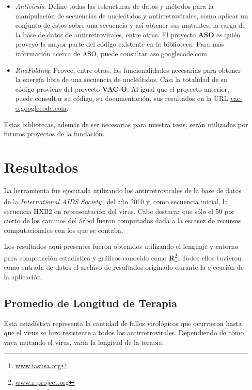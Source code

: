 \begin{itemize}
  \item \textit{Antivirals}: Define todas las estructuras de datos y m\'etodos para la manipulaci\'on de secuencias de nucle\'otidos y antirretrovirales, como
    aplicar un conjunto de \'estos sobre una secuencia y asi obtener sus mutantes, la carga de la base de datos de antirretrovirales, entre otras. El
    proyecto \textbf{ASO} es qui\'en provey\'o la mayor parte del c\'odigo existente en la biblioteca. Para m\'as informaci\'on acerca de ASO, puede
    consultar \url{aso.googlecode.com}.
  \item \textit{RnaFolding}: Provee, entre otras, las funcionalidades necesarias para obtener la energ\'ia libre de una secuencia de nucle\'otidos.
    Casi la totalidad de su c\'odigo proviene del proyecto \textbf{VAC-O}. Al igual que el proyecto anterior, puede consultar su c\'odigo, su
    documentaci\'on, sus resultados en la URL \url{vac-o.googlecode.com}.
\end{itemize}
Estas bibliotecas, adem\'as de ser necesarias para nuestra tesis, ser\'an utilizadas por futuros proyectos de la fundaci\'on.

\newpage
\section{Resultados}
La herramienta fue ejecutada utilizando los antirretrovirales de la base de datos de la \textit{International AIDS
Society}\footnote{\url{www.iasusa.org}}\cite{JBB08} del a\~no 2010 y, como secuencia inicial, la secuencia HXB2 en representaci\'on del virus. 
Cabe destacar que s\'olo el 50 por cierto de los caminos del \'arbol fueron computados dada a la escasez de recursos computacionales con los que se contaba.

Los resultados aqu\'i presentes fueron obtenidos utilizando el lenguaje y entorno para computaci\'on estad\'istica y gr\'aficos conocido como
\textbf{R}\footnote{\url{www.r-project.org}}. Todos ellos tuvieron como entrada de datos el archivo de resultados originado durante la ejecuci\'on de la aplicaci\'on.

\subsection{Promedio de Longitud de Terapia}
  Esta estad\'istica representa la cantidad de fallos virol\'ogicos que ocurrieron hasta que el virus se hizo resistente a todos los antirretrovirales.
  Dependiendo de c\'omo vaya mutando el virus, var\'ia la longitud de la terapia.
  
